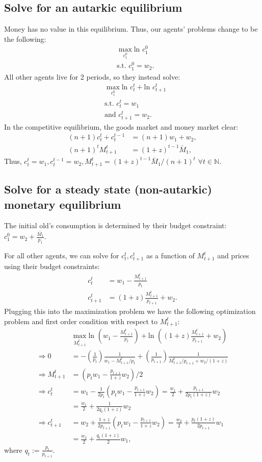 \documentclass[11pt]{article} %
\begin{document}
\subsection{Solve for an autarkic equilibrium}
Money has no value in this equilibrium. Thus, our agents' problems change to be the following:
\begin{align*}
&\max_{c_1^0} \text{ln } c_1^0 \\
&\text{s.t. } c_1^0 = w_2 .
\end{align*}
All other agents live for 2 periods, so they instead solve:
\begin{align*}
&\max_{c_1^0} \text{ln } c_t^t + \text{ln } c_{t+1}^t \\
&\text{s.t. } c_t^t = w_1 \\
&\text{and } c_{t+1}^t = w_2.
\end{align*}
In the competitive equilibrium, the goods market and money market clear:
\begin{align*}
(n+1)c_t^t +c_t^{t-1} &= (n+1)w_1 + w_2, \\
(n+1)^t M_{t+1}^t  &= (1+z)^{t-1}\bar{M}_1,
\end{align*}
Thus, $c_t^t = w_1, c_t^{t-1} = w_2, M_{t+1}^t = (1+z)^{t-1}\bar{M}_1/(n+1)^t $ $\forall t \in \mathbb{N}.$
\subsection{Solve for a steady state (non-autarkic) monetary equilibrium}
The initial old's consumption is determined by their budget constraint: $c_1^0 = w_2 + \frac{\bar{M_1}}{p_1}$.

For all other agents, we can solve for $c_t^t,c_{t+1}^{t}$ as a function of $M_{t+1}^t$ and prices using their budget constraints:
\begin{align*}
c_t^t &= w_1 - \frac{M_{t+1}^t}{p_t}\\
c_{t+1}^t &= (1+z)\frac{M^t_{t+1}}{p_{t+1}} + w_2.
\end{align*}
Plugging this into the maximization problem we have the following optimization problem and first order condition with respect to $M^t_{t+1}:$
\begin{align*}
&\max_{M_{t+1}^t} \text{ln } \left(w_1 - \frac{M_{t+1}^t}{p_t}\right) + \text{ln } \left((1+z)\frac{M^t_{t+1}}{p_{t+1}} + w_2\right) \\
\Rightarrow 0 &=  -\left(\frac{1}{p_t}\right)\frac{1}{w_1 - M^t_{t+1}/p_t} +\left(\frac{1}{p_{t+1}}\right) \frac{1}{M^t_{t+1}/p_{t+1} + w_2/(1+z)} \\
\Rightarrow M^t_{t+1} &= \left( p_tw_1 - \frac{p_{t+1}}{1+z}w_2\right)/2\\
\Rightarrow c_t^t &= w_1 - \frac{1}{2p_t}\left(  p_tw_1 - \frac{p_{t+1}}{1+z}w_2\right) = \frac{w_1}{2} + \frac{p_{t+1}}{2p_t(1+z)}w_2 \\
&= \frac{w_1}{2} + \frac{1}{2q_t(1+z)}w_2 \\
\Rightarrow c_{t+1}^t &= w_2 + \frac{1+z}{2p_{t+1}}\left(  p_tw_1 - \frac{p_{t+1}}{1+z}w_2\right) = \frac{w_2}{2} + \frac{p_t(1+z)}{2p_{t+1}}w_1 \\
&= \frac{w_2}{2} + \frac{q_t(1+z)}{2}w_1 ,
\end{align*}
where $q_t:= \frac{p_t}{p_{t+1}}$.
\end{document}

